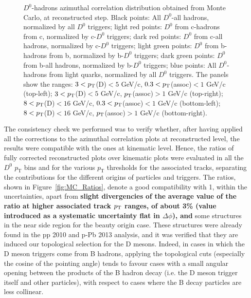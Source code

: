 \begin{figure}
\caption{$D^0$-hadrons azimuthal correlation distribution obtained from Monte Carlo, at reconstructed step. Black points: All $D^0$-all hadrons, normalized by all $D^0$ triggers; light red points: $D^0$ from c-hadrons from c, normalized by c-$D^0$ triggers; dark red points: $D^0$ from c-all hadrons, normalized by c-$D^0$ triggers; light green points: $D^0$ from b-hadrons from b, normalized by b-$D^0$ triggers; dark green points: $D^0$ from b-all hadrons, normalized by b-$D^0$ triggers; blue points: All $D^0$-hadrons from light quarks, normalized by all $D^0$ triggers.
The panels show the ranges: $3 < p_{\rm T}$(D)$ < 5$ GeV/c, $0.3 < p_{\rm T}$(assoc)$ < 1$ GeV/c (top-left); $3 < p_{\rm T}$(D)$ < 5$ GeV/c, $p_{\rm T}$(assoc)$ > 1$ GeV/c (top-right); $8 < p_{\rm T}$(D)$ < 16$ GeV/c, $0.3 < p_{\rm T}$(assoc)$ < 1$ GeV/c (bottom-left); $8 < p_{\rm T}$(D)$ < 16$ GeV/c, $p_{\rm T}$(assoc)$ > 1$ GeV/c (bottom-right).}
\label{fig:MC_Reco}
\end{figure}

The consistency check we performed was to verify whether, after having applied all the corrections to the azimuthal correlation plots at reconstructed level, the results were compatible with the ones at kinematic level. Hence, the ratios of fully corrected reconstructed plots over kinematic plots were evaluated in all the $D^0$ $p_\text{T}$ bins and for the various $p_\text{T}$ thresholds for the associated tracks, separating the contributions for the different origins of particles and triggers. The ratios, shown in Figure~\ref{fig:MC_Ratios}, denote a good compatibility with 1, within the uncertainties, apart from {\bf slight divergencies of the average value of the ratio at higher associated track $p_{\rm T}$ ranges, of about 3\% (value introduced as a systematic uncertainty flat in $\Delta\phi$), and} some structures in the near side region for the beauty origin case.
These structures were already found in the pp 2010 and p-Pb 2013 analysis, and it was verified that they are induced our topological selection for the D mesons. Indeed, in cases in which the D meson triggers come from B hadrons, applying the topological cuts (especially the cosine of the pointing angle) tends to favour cases with a small angular opening between the products of the B hadron decay (i.e. the D meson trigger itself and other particles), with respect to cases where the B decay particles are less collinear.

